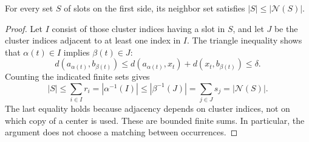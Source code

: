 \begin{lemma}
\label{lem:coverage-hall}
For every set $S$ of slots on the first side, its neighbor set satisfies
$|S|\leq|\mathcal N(S)|$.
\end{lemma}
\begin{proof}
Let $I$ consist of those cluster indices having a slot in $S$, and let $J$
be the cluster indices adjacent to at least one index in $I$.  The triangle
inequality shows that $\alpha(t)\in I$ implies $\beta(t)\in J$:
\[
 d(a_{\alpha(t)},b_{\beta(t)})
 \leq d(a_{\alpha(t)},x_t)+d(x_t,b_{\beta(t)})\leq\delta.
\]
Counting the indicated finite sets gives
\[
 |S|\leq\sum_{i\in I}r_i
   =|\alpha^{-1}(I)|
   \leq|\beta^{-1}(J)|
   =\sum_{j\in J}s_j=|\mathcal N(S)|.
\]
The last equality holds because adjacency depends on cluster indices, not on
which copy of a center is used.  These are bounded finite sums.  In
particular, the argument does not choose a matching between occurrences.
\end{proof}

